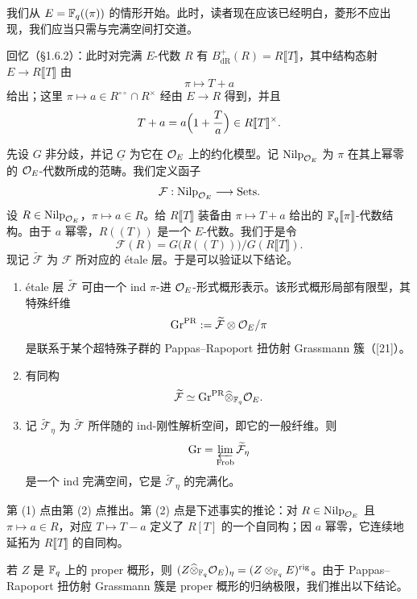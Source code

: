 \leavevmode 我们从 $E=\mathbb{F}_q((\pi))$ 的情形开始。此时，读者现在应该已经明白，菱形不应出现，我们应当只需与完满空间打交道。

回忆（§1.6.2）：此时对完满 $E$-代数 $R$ 有 $B_{\mathrm{dR}}^+(R)=R\llbracket T\rrbracket$，其中结构态射 $E\to R\llbracket T\rrbracket$ 由
\[
  \pi\longmapsto T+a
\]
给出；这里 $\pi\mapsto a\in R^{\circ\circ}\cap R^\times$ 经由 $E\to R$ 得到，并且
\[
  T+a=a\Bigl(1+\frac{T}{a}\Bigr)\in R\llbracket T\rrbracket^\times .
\]

先设 $G$ 非分歧，并记 $\underline{G}$ 为它在 $\mathcal{O}_E$ 上的约化模型。记 $\mathrm{Nilp}_{\mathcal{O}_E}$ 为 $\pi$ 在其上幂零的 $\mathcal{O}_E$-代数所成的范畴。我们定义函子
\[
  \mathcal{F}:\mathrm{Nilp}_{\mathcal{O}_E}\longrightarrow\mathrm{Sets}.
\]
设 $R\in\mathrm{Nilp}_{\mathcal{O}_E}$，$\pi\mapsto a\in R$。给 $R\llbracket T\rrbracket$ 装备由 $\pi\mapsto T+a$ 给出的 $\mathbb{F}_q\llbracket\pi\rrbracket$-代数结构。由于 $a$ 幂零，$R((T))$ 是一个 $E$-代数。我们于是令
\[
  \mathcal{F}(R)=G\bigl(R((T))\bigr)/G(R\llbracket T\rrbracket).
\]
现记 $\widetilde{\mathcal{F}}$ 为 $\mathcal{F}$ 所对应的 étale 层。于是可以验证以下结论。

\begin{proposition}\label{prop:3.10}
\begin{enumerate}[label=(\arabic*)]
  \item étale 层 $\widetilde{\mathcal{F}}$ 可由一个 ind $\pi$-进 $\mathcal{O}_E$-形式概形表示。该形式概形局部有限型，其特殊纤维
  \[
    \mathrm{Gr}^{\mathrm{PR}}:=\widetilde{\mathcal{F}}\otimes\mathcal{O}_E/\pi
  \]
  是联系于某个超特殊子群的 Pappas–Rapoport 扭仿射 Grassmann 簇（[21]）。
  \item 有同构
  \[
    \widetilde{\mathcal{F}}\simeq\mathrm{Gr}^{\mathrm{PR}}\widehat{\otimes}_{\mathbb{F}_q}\mathcal{O}_E .
  \]
  \item 记 $\widetilde{\mathcal{F}}_\eta$ 为 $\widetilde{\mathcal{F}}$ 所伴随的 ind-刚性解析空间，即它的一般纤维。则
  \[
    \mathrm{Gr}=\varprojlim_{\mathrm{Frob}}\widetilde{\mathcal{F}}_\eta
  \]
  是一个 ind 完满空间，它是 $\widetilde{\mathcal{F}}_\eta$ 的完满化。
\end{enumerate}
\end{proposition}

第 (1) 点由第 (2) 点推出。第 (2) 点是下述事实的推论：对 $R\in\mathrm{Nilp}_{\mathcal{O}_E}$ 且 $\pi\mapsto a\in R$，对应 $T\mapsto T-a$ 定义了 $R[T]$ 的一个自同构；因 $a$ 幂零，它连续地延拓为 $R\llbracket T\rrbracket$ 的自同构。

若 $Z$ 是 $\mathbb{F}_q$ 上的 proper 概形，则 $(Z\widehat{\otimes}_{\mathbb{F}_q}\mathcal{O}_E)_\eta=(Z\otimes_{\mathbb{F}_q}E)^{\mathrm{rig}}$。由于 Pappas–Rapoport 扭仿射 Grassmann 簇是 proper 概形的归纳极限，我们推出以下结论。

